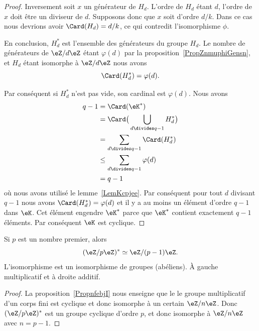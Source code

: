 \begin{proof}
    Inversement soit \( x\) un générateur de \( H_d\). L'ordre de \( H_d\) étant \( d\), l'ordre de \( x\) doit être un diviseur de \( d\). Supposons donc que \( x\) soit d'ordre \( d/k\). Dans ce cas nous devrions avoir \( \Card(H_d)=d/k\), ce qui contredit l'isomorphisme \( \phi\).

    En conclusion, \( H^*_d\) est l'ensemble des générateurs du groupe \( H_d\). Le nombre de générateurs de \( \eZ/d\eZ\) étant \( \varphi(d)\) par la proposition~\ref{PropZnmuphiGensn}, et \( H_d\) étant isomorphe à \( \eZ/d\eZ\) nous avons
    \begin{equation}
        \Card(H^*_d)=\varphi(d).
    \end{equation}

    Par conséquent si \( H^*_d\) n'est pas vide, son cardinal est \( \varphi(d)\). Nous avons
    \begin{subequations}
        \begin{align}
            q-1&=\Card(\eK^*)\\
            &=\Card\big( \bigcup_{d\divides q-1}H^*_d \big)\\
            &=\sum_{d\divides q-1}\Card(H^*_d)\\
            &\leq \sum_{d\divides q-1}\varphi(d)\\
            &=q-1
        \end{align}
    \end{subequations}
    où nous avons utilisé le lemme~\ref{LemKcpjee}. Par conséquent pour tout \( d\) divisant \( q-1\) nous avons \( \Card(H^*_d)=\varphi(d)\) et il y a au moins un élément d'ordre \( q-1\) dans \( \eK\). Cet élément engendre \( \eK^*\) parce que \( \eK^*\) contient exactement \( q-1\) éléments. Par conséquent \( \eK\) est cyclique.
\end{proof}

\begin{corollary}   \label{CorpRUndR}
    Si \( p\) est un nombre premier, alors
    \begin{equation}
        (\eZ/p\eZ)^*\simeq\eZ/(p-1)\eZ.
    \end{equation}
    L'isomorphisme est un isomorphisme de groupes (abéliens). À gauche multiplicatif et à droite additif.
\end{corollary}

\begin{proof}
    La proposition~\ref{PropnfebjI} nous enseigne que le le groupe multiplicatif d'un corps fini est cyclique et donc isomorphe à un certain \( \eZ/n\eZ\). Donc \( (\eZ/p\eZ)^*\) est un groupe cyclique d'ordre \( p\), et donc isomorphe à \( \eZ/n\eZ\) avec \( n=p-1\).
\end{proof}

